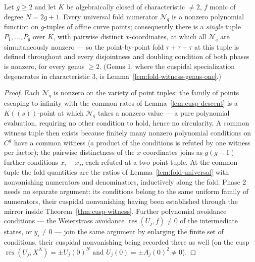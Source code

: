 \begin{theorem}
\label{thm:fold-witness}
\leanok
{}
Let $g \ge 2$ and let $K$ be algebraically closed of characteristic $\neq 2$, $f$ monic
of degree $N = 2g+1$. Every universal fold numerator $\mathcal{N}_q$ is a nonzero
polynomial function on $g$-tuples of affine curve points; consequently there is a
\emph{single} tuple $P_1, \dots, P_g$ over $K$, with pairwise distinct $x$-coordinates,
at which all $\mathcal{N}_q$ are simultaneously nonzero --- so the point-by-point fold
$\tau + \tau - \tau$ at this tuple is defined throughout and every disjointness and
doubling condition of both phases is nonzero, for every genus $\ge 2$. (Genus $1$,
where the cuspidal specialization degenerates in characteristic $3$, is
Lemma~\ref{lem:fold-witness-genus-one}.)
\end{theorem}
\begin{proof}
\leanok
Each $\mathcal{N}_q$ is nonzero on the variety of point tuples: the family of points
escaping to infinity with the common rates of Lemma~\ref{lem:cusp-descent} is a
$K(\!(s)\!)$-point at which $\mathcal{N}_q$ takes a nonzero value --- a pure polynomial
evaluation, requiring no other condition to hold, hence no circularity. A common
witness tuple then exists because finitely many nonzero polynomial conditions on $C^g$
have a common witness (a product of the conditions is refuted by one witness per
factor); the pairwise distinctness of the $x$-coordinates joins as $g(g-1)$ further
conditions $x_i - x_j$, each refuted at a two-point tuple. At the common tuple the fold
quantities are the ratios of Lemma~\ref{lem:fold-universal} with nonvanishing
numerators and denominators, inductively along the fold. Phase 2 needs no separate
argument: its conditions belong to the same uniform family of numerators, their
cuspidal nonvanishing having been established through the mirror inside
Theorem~\ref{thm:cusp-witness}. Further polynomial avoidance conditions --- the
Weierstrass avoidance $\operatorname{res}(U_j, f) \neq 0$ of the intermediate states,
or $y_i \neq 0$ --- join the same argument by enlarging the finite set of conditions,
their cuspidal nonvanishing being recorded there as well (on the cusp
$\operatorname{res}(U_j, X^N) = \pm U_j(0)^N$ and $U_j(0) = \pm A_j(0)^2 \neq 0$).
\end{proof}

